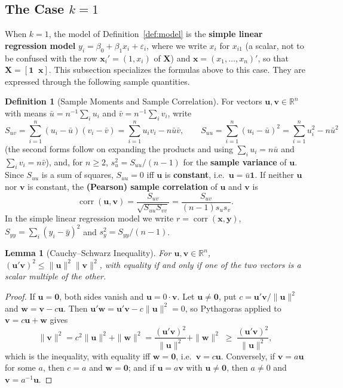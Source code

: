 \documentclass[14pt]{extarticle}
\theoremstyle{plain}
\newtheorem{lemma}[theorem]{Lemma}
\theoremstyle{definition}
\newtheorem{definition}[theorem]{Definition}
\theoremstyle{remark}
\DeclareMathOperator\corr{corr}
\newcommand{\bX}{\mathbf{X}}
\newcommand{\by}{\mathbf{y}}
\newcommand{\bx}{\mathbf{x}}
\newcommand{\bone}{\mathbf{1}}
\newcommand{\bzero}{\mathbf{0}}
\newcommand{\bw}{\mathbf{w}}
\newcommand{\bv}{\mathbf{v}}
\newcommand{\Real}{\mathbb{R}}
\newcommand{\bu}{\mathbf{u}}
\begin{document}
\subsection{The Case \texorpdfstring{$k = 1$}{k = 1}}\label{sec:k1}

When $k = 1$, the model of Definition~\ref{def:model} is the \textbf{simple linear regression model} $y_i = \beta_0 + \beta_1 x_i + \varepsilon_i$, where we write $x_i$ for $x_{i1}$ (a scalar, not to be confused with the row $\bx_i' = (1, x_i)$ of $\bX$) and $\bx = (x_1, \ldots, x_n)'$, so that $\bX = [\bone \;\; \bx]$. This subsection specializes the formulas above to this case. They are expressed through the following sample quantities.

\begin{definition}[Sample Moments and Sample Correlation]\label{def:corr}
For vectors $\bu, \bv \in \Real^n$ with means $\bar u = n^{-1}\sum_i u_i$ and $\bar v = n^{-1}\sum_i v_i$, write
\[
S_{uv} = \sum_{i=1}^n (u_i - \bar u)(v_i - \bar v) = \sum_{i=1}^n u_iv_i - n\bar u\bar v, \qquad S_{uu} = \sum_{i=1}^n (u_i - \bar u)^2 = \sum_{i=1}^n u_i^2 - n\bar u^2
\]
(the second forms follow on expanding the products and using $\sum_i u_i = n\bar u$ and $\sum_i v_i = n\bar v$), and, for $n \geqslant 2$, $s_u^2 = S_{uu}/(n-1)$ for the \textbf{sample variance} of $\bu$. Since $S_{uu}$ is a sum of squares, $S_{uu} = 0$ iff $\bu$ is \textbf{constant}, i.e.\ $\bu = \bar u\bone$. If neither $\bu$ nor $\bv$ is constant, the \textbf{(Pearson) sample correlation} of $\bu$ and $\bv$ is
\[
\corr(\bu, \bv) = \frac{S_{uv}}{\sqrt{S_{uu}S_{vv}}} = \frac{S_{uv}}{(n-1)s_us_v}.
\]
In the simple linear regression model we write $r = \corr(\bx, \by)$, $S_{yy} = \sum_i(y_i - \bar y)^2$ and $s_y^2 = S_{yy}/(n-1)$.
\end{definition}

\begin{lemma}[Cauchy--Schwarz Inequality]\label{lem:cs}
For $\bu, \bv \in \Real^n$, $(\bu'\bv)^2 \leqslant \|\bu\|^2\|\bv\|^2$, with equality if and only if one of the two vectors is a scalar multiple of the other.
\end{lemma}

\begin{proof}
If $\bu = \bzero$, both sides vanish and $\bu = 0 \cdot \bv$. Let $\bu \neq \bzero$, put $c = \bu'\bv/\|\bu\|^2$ and $\bw = \bv - c\bu$. Then $\bu'\bw = \bu'\bv - c\|\bu\|^2 = 0$, so Pythagoras applied to $\bv = c\bu + \bw$ gives
\[
\|\bv\|^2 = c^2\|\bu\|^2 + \|\bw\|^2 = \frac{(\bu'\bv)^2}{\|\bu\|^2} + \|\bw\|^2 \;\geqslant\; \frac{(\bu'\bv)^2}{\|\bu\|^2},
\]
which is the inequality, with equality iff $\bw = \bzero$, i.e.\ $\bv = c\bu$. Conversely, if $\bv = a\bu$ for some $a$, then $c = a$ and $\bw = \bzero$; and if $\bu = a\bv$ with $\bu \neq \bzero$, then $a \neq 0$ and $\bv = a^{-1}\bu$.
\end{proof}
\end{document}
